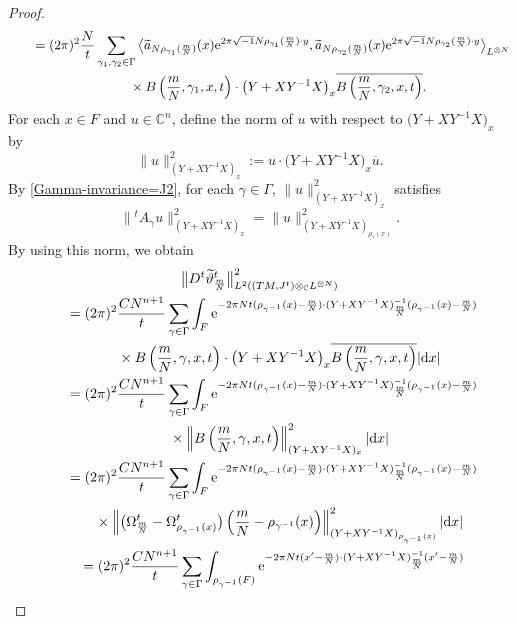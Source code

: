 \documentclass[pdftex]{sigma}
\numberwithin{equation}{section}
\newcommand{\C}{\mathbb{C}}
\renewcommand{\tilde}{\widetilde}
\newcommand{\abs}[1]{\lvert#1\rvert}
\newcommand{\norm}[1]{\lVert#1\rVert}
\begin{document}
\begin{proof}
\begin{gather*}
\qquad=(2\pi)^2\frac{N}{t}\sum_{\gamma_1, \gamma_2 \in \Gamma}\big\langle {\tilde a}_{N\rho_{\gamma_1}(\frac{m}{N})}(x){\rm e}^{2\pi\sqrt{-1}N\rho_{\gamma_1} (\frac{m}{N})\cdot y}, {\tilde a}_{N\rho_{\gamma_2}(\frac{m}{N})}(x){\rm e}^{2\pi\sqrt{-1}N\rho_{\gamma_2} (\frac{m}{N})\cdot y}\big\rangle_{L^{\otimes N}}\\
\phantom{\qquad=}{} \times B\left(\frac{m}{N}, \gamma_1 ,x,t\right)\cdot \bigl(Y+XY^{-1}X\bigr)_x \overline{ B\left(\frac{m}{N}, \gamma_2 ,x,t\right)}.
\end{gather*}
For each $x\in F$ and $u\in \C^n$, define the norm of $u$ with respect to $\bigl(Y+XY^{-1}X\bigr)_x$ by
\[
\norm{u}^2_{(Y+XY^{-1}X)_x}:=u\cdot \bigl(Y+XY^{-1}X\bigr)_x\overline{u}.
\]
By \eqref{Gamma-invariance=J2}, for each $\gamma \in \Gamma$, $\norm{u}^2_{(Y+XY^{-1}X)_x}$ satisfies
\[
\big\|{}^tA_{\gamma}u\big\|^2_{(Y+XY^{-1}X)_x}=\norm{u}^2_{(Y+XY^{-1}X)_{\rho_\gamma (x)}}.
\]
By using this norm, we obtain
\begin{gather*}%
\big\|D^t {\tilde \vartheta}^t_{\frac{m}{N}}\big\|_{L^2((TM, J^t)\otimes_{\C}L^{\otimes N})}^2 \\
\qquad=(2\pi)^2\frac{C N^{n+1}}{t}\sum_{\gamma \in \Gamma}\int_F {\rm e}^{-2\pi Nt(\rho_{\gamma^{-1}}(x)-\frac{m}{N})\cdot ( Y+XY^{-1}X)^{-1}_{\frac{m}{N}}(\rho_{\gamma^{-1}}(x)-\frac{m}{N})} \\
\phantom{\qquad=}{} \times B\left(\frac{m}{N}, \gamma ,x,t\right)\cdot \bigl(Y+XY^{-1}X\bigr)_x \overline{ B\left(\frac{m}{N}, \gamma ,x,t\right)}\abs{{\rm d}x}\nonumber %
\\
\qquad=(2\pi)^2\frac{C N^{n+1}}{t}\sum_{\gamma \in \Gamma}\int_F {\rm e}^{-2\pi Nt(\rho_{\gamma^{-1}}(x)-\frac{m}{N})\cdot ( Y+XY^{-1}X)^{-1}_{\frac{m}{N}}(\rho_{\gamma^{-1}}(x)-\frac{m}{N})} \\
\phantom{\qquad=}{} \times \left\lVert B\left(\frac{m}{N}, \gamma ,x,t\right)\right\rVert^2_{(Y+XY^{-1}X)_x}\abs{{\rm d}x} \\
\qquad=(2\pi)^2\frac{C N^{n+1}}{t}\sum_{\gamma \in \Gamma}\int_F {\rm e}^{-2\pi Nt(\rho_{\gamma^{-1}}(x)-\frac{m}{N})\cdot ( Y+XY^{-1}X)^{-1}_{\frac{m}{N}}(\rho_{\gamma^{-1}}(x)-\frac{m}{N})} \\
\phantom{\qquad=}{} \times \left\lVert \bigl( \Omega^t_{\frac{m}{N}}-\Omega^t_{\rho_{\gamma^{-1}}(x)}\bigr)\left(\frac{m}{N}-\rho_{\gamma^{-1}}(x)\right)\right\rVert^2_{(Y+XY^{-1}X)_{\rho_{\gamma^{-1}}(x)}}\abs{{\rm d}x} \\
\qquad= (2\pi)^2\frac{C N^{n+1}}{t}\sum_{\gamma \in \Gamma}\int_{\rho_{\gamma^{-1}}(F)} {\rm e}^{-2\pi Nt(x'-\frac{m}{N})\cdot ( Y+XY^{-1}X)^{-1}_{\frac{m}{N}}(x'-\frac{m}{N})} \\

\end{gather*}
\end{proof}
\end{document}
